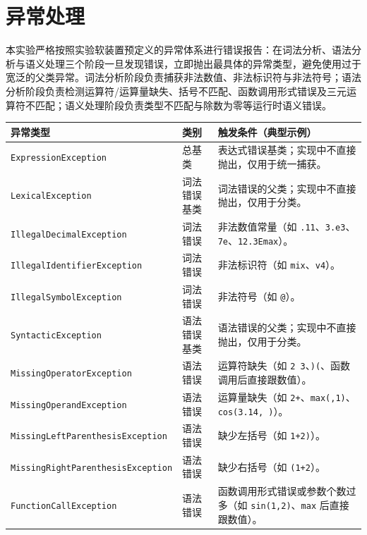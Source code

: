 \section{异常处理}
本实验严格按照实验软装置预定义的异常体系进行错误报告：在词法分析、语法分析与语义处理三个阶段一旦发现错误，立即抛出最具体的异常类型，避免使用过于宽泛的父类异常。词法分析阶段负责捕获非法数值、非法标识符与非法符号；语法分析阶段负责检测运算符/运算量缺失、括号不匹配、函数调用形式错误及三元运算符不匹配；语义处理阶段负责类型不匹配与除数为零等运行时语义错误。

\begin{table}[htbp]
    \centering
    \small
    \renewcommand{\arraystretch}{1.2}
    \begin{tabular}{|p{6.3cm}|p{3cm}|p{5cm}|}
    \hline
    \textbf{异常类型} & \textbf{类别} & \textbf{触发条件（典型示例）} \\
    \hline
    \texttt{ExpressionException} & 总基类 & 表达式错误基类；实现中不直接抛出，仅用于统一捕获。 \\
    \hline
    \texttt{LexicalException} & 词法错误基类 & 词法错误的父类；实现中不直接抛出，仅用于分类。 \\
    \hline
    \texttt{IllegalDecimalException} & 词法错误 & 非法数值常量（如 \texttt{.11}、\texttt{3.e3}、\texttt{7e}、\texttt{12.3Emax}）。 \\
    \hline
    \texttt{IllegalIdentifierException} & 词法错误 & 非法标识符（如 \texttt{mix}、\texttt{v4}）。 \\
    \hline
    \texttt{IllegalSymbolException} & 词法错误 & 非法符号（如 \texttt{@}）。 \\
    \hline
    \texttt{SyntacticException} & 语法错误基类 & 语法错误的父类；实现中不直接抛出，仅用于分类。 \\
    \hline
    \texttt{MissingOperatorException} & 语法错误 & 运算符缺失（如 \texttt{2 3}、\texttt{)(}、函数调用后直接跟数值）。 \\
    \hline
    \texttt{MissingOperandException} & 语法错误 & 运算量缺失（如 \texttt{2+}、\texttt{max(,1)}、\texttt{cos(3.14, )}）。 \\
    \hline
    \texttt{MissingLeftParenthesisException} & 语法错误 & 缺少左括号（如 \texttt{1+2)}）。 \\
    \hline
    \texttt{MissingRightParenthesisException} & 语法错误 & 缺少右括号（如 \texttt{(1+2}）。 \\
    \hline
    \texttt{FunctionCallException} & 语法错误 & 函数调用形式错误或参数个数过多（如 \texttt{sin(1,2)}、\texttt{max} 后直接跟数值）。 \\

\end{tabular}
\end{table}

